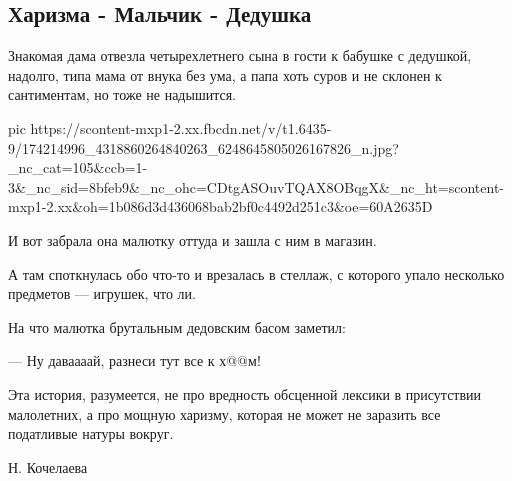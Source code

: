  
 
 
 
 
\subsection{Харизма - Мальчик - Дедушка}
\label{sec:17_04_2021.fb.kotova_ksenia.1.harizma}

Знакомая дама отвезла четырехлетнего сына в гости к бабушке с дедушкой,
надолго, типа мама от внука без ума, а папа хоть суров и не склонен к
сантиментам, но тоже не надышится.

\ifcmt
  pic https://scontent-mxp1-2.xx.fbcdn.net/v/t1.6435-9/174214996_4318860264840263_6248645805026167826_n.jpg?_nc_cat=105&ccb=1-3&_nc_sid=8bfeb9&_nc_ohc=CDtgASOuvTQAX8OBqgX&_nc_ht=scontent-mxp1-2.xx&oh=1b086d3d436068bab2bf0c4492d251c3&oe=60A2635D
\fi

И вот забрала она малютку оттуда и зашла с ним в магазин.

А там споткнулась обо что-то и врезалась в стеллаж, с которого упало несколько предметов — игрушек, что ли.

На что малютка брутальным дедовским басом заметил:

— Ну даваааай, разнеси тут все к х@@м!

Эта история, разумеется, не про вредность обсценной лексики в присутствии
малолетних, а про мощную харизму, которая не может не заразить все податливые
натуры вокруг.

Н. Кочелаева
